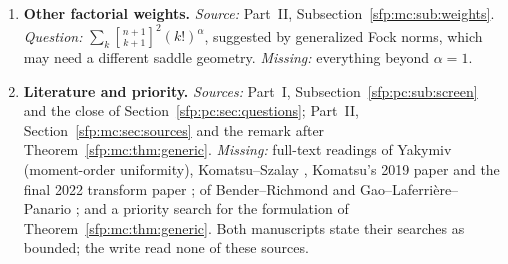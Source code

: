 \documentclass[11pt,letterpaper]{article}
\numberwithin{equation}{section}
\theoremstyle{definition}\newtheorem{definition}[theorem]{Definition}
\theoremstyle{remark}\newtheorem{remark}[theorem]{Remark}
\newcommand{\sone}[2]{\genfrac{[}{]}{0pt}{}{#1}{#2}}
\begin{document}
\begin{enumerate}
\item\label{sfp:q:weights} \textbf{Other factorial weights.} \emph{Source:} Part~II, Subsection~\ref{sfp:mc:sub:weights}. \emph{Question:} $\sum_k\sone{n+1}{k+1}^2(k!)^\alpha$, suggested by generalized Fock norms, which may need a different saddle geometry. \emph{Missing:} everything beyond $\alpha=1$.
\item\label{sfp:q:literature} \textbf{Literature and priority.} \emph{Sources:} Part~I, Subsection~\ref{sfp:pc:sub:screen} and the close of Section~\ref{sfp:pc:sec:questions}; Part~II, Section~\ref{sfp:mc:sec:sources} and the remark after Theorem~\ref{sfp:mc:thm:generic}. \emph{Missing:} full-text readings of Yakymiv \cite{yakymiv} (moment-order uniformity), Komatsu--Szalay \cite{shifted}, Komatsu's 2019 paper \cite{recurrence} and the final 2022 transform paper \cite{transform}; of Bender--Richmond \cite{bender} and Gao--Laferri\`ere--Panario \cite{gao}; and a priority search for the formulation of Theorem~\ref{sfp:mc:thm:generic}. Both manuscripts state their searches as bounded; the write read none of these sources.
\end{enumerate}
\end{document}
